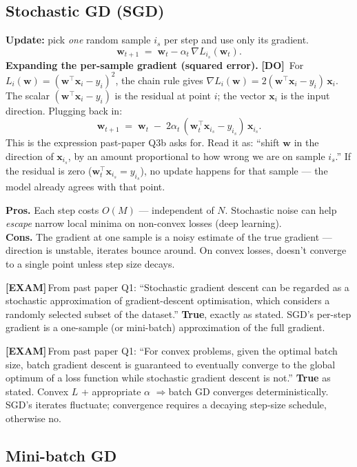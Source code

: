 \documentclass[11pt, a4paper]{article}
\newcommand{\examflag}{\textcolor{tipBd}{\textbf{[EXAM]}}\,}
\newcommand{\doflag}{\textcolor{defBd}{\textbf{[DO]}}\,}
\begin{document}
\subsection{Stochastic GD (SGD)}

\textbf{Update:} pick \emph{one} random sample $i_s$ per step and use only its gradient.
\[
\mathbf{w}_{t+1} \;=\; \mathbf{w}_t - \alpha_t\,\nabla L_{i_s}(\mathbf{w}_t).
\]
\textbf{Expanding the per-sample gradient (squared error).} \doflag{} For $L_i(\mathbf{w}) = (\mathbf{w}^\top\mathbf{x}_i - y_i)^2$, the chain rule gives $\nabla L_i(\mathbf{w}) = 2(\mathbf{w}^\top\mathbf{x}_i - y_i)\,\mathbf{x}_i$. The scalar $(\mathbf{w}^\top\mathbf{x}_i - y_i)$ is the residual at point $i$; the vector $\mathbf{x}_i$ is the input direction. Plugging back in:
\[
\mathbf{w}_{t+1} \;=\; \mathbf{w}_t \;-\; 2\alpha_t\,(\mathbf{w}_t^\top\mathbf{x}_{i_s} - y_{i_s})\,\mathbf{x}_{i_s}.
\]
This is the expression past-paper Q3b asks for. Read it as: ``shift $\mathbf{w}$ in the direction of $\mathbf{x}_{i_s}$, by an amount proportional to how wrong we are on sample $i_s$.'' If the residual is zero ($\mathbf{w}_t^\top\mathbf{x}_{i_s} = y_{i_s}$), no update happens for that sample — the model already agrees with that point.

\textbf{Pros.} Each step costs $O(M)$ — independent of $N$. Stochastic noise can help \emph{escape} narrow local minima on non-convex losses (deep learning).\\
\textbf{Cons.} The gradient at one sample is a noisy estimate of the true gradient — direction is unstable, iterates bounce around. On convex losses, doesn't converge to a single point unless step size decays.

\examflag{}From past paper Q1: ``Stochastic gradient descent can be regarded as a stochastic approximation of gradient-descent optimisation, which considers a randomly selected subset of the dataset.'' \textbf{True}, exactly as stated. SGD's per-step gradient is a one-sample (or mini-batch) approximation of the full gradient.

\examflag{}From past paper Q1: ``For convex problems, given the optimal batch size, batch gradient descent is guaranteed to eventually converge to the global optimum of a loss function while stochastic gradient descent is not.'' \textbf{True} as stated. Convex $L$ + appropriate $\alpha$ $\Rightarrow$batch GD converges deterministically. SGD's iterates fluctuate; convergence requires a decaying step-size schedule, otherwise no.

\subsection{Mini-batch GD}
\end{document}
